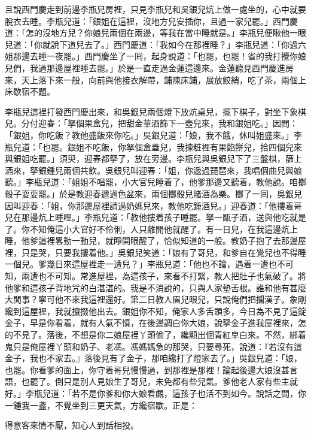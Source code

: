 且說西門慶走到前邊李瓶兒房裡，只見李瓶兒和吳銀兒炕上做一處坐的，心中就要脫衣去睡。李瓶兒道：「銀姐在這裡，沒地方兒安插你，且過一家兒罷。」西門慶道：「怎的沒地方兒？你娘兒兩個在兩邊，等我在當中睡就是。」李瓶兒便瞅他一眼兒道：「你就說下道兒去了。」西門慶道：「我如今在那裡睡？」李瓶兒道：「你過六姐那邊去睡一夜罷。」西門慶坐了一囘，起身說道：「也罷，也罷！省的我打攪你娘兒們，我過那邊屋裡睡去罷。」於是一直走過金蓮這邊來。金蓮聽見西門慶進房來，天上落下來一般，向前與他接衣解帶，鋪陳床鋪，展放鮫綃，吃了茶，兩個上床歇宿不題。

李瓶兒這裡打發西門慶出來，和吳銀兒兩個燈下放炕桌兒，擺下棋子，對坐下象棋兒。分付迎春：「拏個果盒兒，把甜金華酒篩下一壺兒來，我和銀姐吃。」因問：「銀姐，你吃飯？教他盛飯來你吃。」吳銀兒道：「娘，我不餓，休叫姐盛來。」李瓶兒道：「也罷。銀姐不吃飯，你拏個盒蓋兒，我揀粧裡有果餡餅兒，拾四個兒來與銀姐吃罷。」須臾，迎春都拏了，放在旁邊。李瓶兒與吳銀兒下了三盤棋，篩上酒來，拏銀鍾兒兩個共飲。吳銀兒叫迎春：「姐，你遞過琵琶來，我唱個曲兒與娘聽。」李瓶兒道：「姐姐不唱罷，小大官兒睡着了，他爹那邊又聽着，教他說。咱擲骰子耍耍罷。」於是教迎春遞過色盆來，兩個擲骰兒賭酒為樂。擲了一囘，吳銀兒因叫迎春：「姐，你那邊屋裡請過奶媽兒來，教他吃鍾酒兒。」迎春道：「他摟着哥兒在那邊炕上睡哩。」李瓶兒道：「教他摟着孩子睡罷。拏一甌子酒，送與他吃就是了。你不知俺這小大官好不伶俐，人只離開他就醒了。有一日兒，在我這邊炕上睡，他爹這裡畧動一動兒，就睜開眼醒了，恰似知道的一般。教奶子抱了去那邊屋裡，只是哭，只要我摟着他。」吳銀兒笑道：「娘有了哥兒，和爹自在覺兒也不得睡一個兒。爹幾日來這屋裡走一遭兒？」李瓶兒道：「他也不論，遇着一遭也不可知，兩遭也不可知。常進屋裡，為這孩子，來看不打緊，教人把肚子也氣破了。將他爹和這孩子背地咒的白湛湛的。我是不消說的，只與人家墊舌根。誰和他有甚麼大閒事？寧可他不來我這裡還好。第二日教人眉兒眼兒，只說俺們把攔漢子。象剛纔到這屋裡，我就攛掇他出去。銀姐你不知，俺家人多舌頭多，今日為不見了這錠金子，早是你看着，就有人氣不憤，在後邊調白你大娘，說拏金子進我屋裡來，怎的不見了。落後，不想是你二娘屋裡丫頭偷了，纔顯出個青紅皁白來。不然，綁着鬼只是俺屋裡丫頭和奶子、老馮。馮媽媽急的那哭，只要尋死，說道：『若沒有這金子，我也不家去。』落後見有了金子，那咱纔打了燈家去了。」吳銀兒道：「娘，也罷。你看爹的面上，你守着哥兒慢慢過，到那裡是那裡！論起後邊大娘沒甚言語，也罷了。倒只是別人見娘生了哥兒，未免都有些兒氣。爹他老人家有些主就好。」李瓶兒道：「若不是你爹和你大娘看覷，這孩子也活不到如今。說話之間，你一鍾我一盞，不覺坐到三更天氣，方纔宿歇。正是：

\begin{myquote}
得意客來情不厭，知心人到話相投。
\end{myquote}

